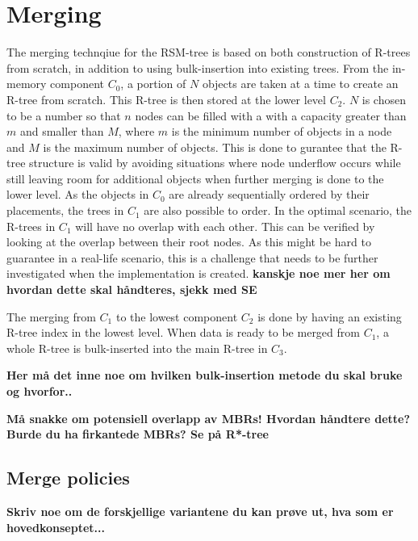 \section{Merging}
\label{sect:RSM-Merging}
The merging technqiue for the RSM-tree is based on both construction of R-trees from scratch, in addition to using bulk-insertion into existing trees. From the in-memory component $C_0$, a portion of $N$ objects are taken at a time to create an R-tree from scratch. This R-tree is then stored at the lower level $C_2$. $N$ is chosen to be a number so that $n$ nodes can be filled with a with a capacity greater than $m$ and smaller than $M$, where $m$ is the minimum number of objects in a node and $M$ is the maximum number of objects. This is done to gurantee that the R-tree structure is valid by avoiding situations where node underflow occurs while still leaving room for additional objects when further merging is done to the lower level. As the objects in $C_0$ are already sequentially ordered by their placements, the trees in $C_1$ are also possible to order. In the optimal scenario, the R-trees in $C_1$ will have no overlap with each other. This can be verified by looking at the overlap between their root nodes. As this might be hard to guarantee in a real-life scenario, this is a challenge that needs to be further investigated when the implementation is created.  \textbf{kanskje noe mer her om hvordan dette skal håndteres, sjekk med SE} \newline

The merging from $C_1$ to the lowest component $C_2$ is done by having an existing R-tree index in the lowest level. When data is ready to be merged from $C_1$, a whole R-tree is bulk-inserted into the main R-tree in $C_3$.

\textbf{Her må det inne noe om hvilken bulk-insertion metode du skal bruke og hvorfor..}

\textbf{Må snakke om potensiell overlapp av MBRs! Hvordan håndtere dette? Burde du ha firkantede MBRs? Se på R*-tree}

\subsection{Merge policies}
\textbf{Skriv noe om de forskjellige variantene du kan prøve ut, hva som er hovedkonseptet...}